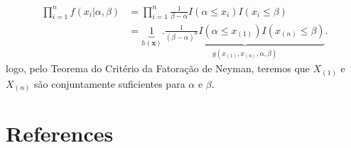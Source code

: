 \documentclass[
  letterpaper,
  DIV=11,
  numbers=noendperiod]{scrartcl}
\newlength{\cslhangindent}
\newenvironment{CSLReferences}[2] %
 {\begin{list}{}{%
  \setlength{\itemindent}{0pt}
  \setlength{\leftmargin}{0pt}
  \setlength{\parsep}{0pt}
  \ifodd #1
   \setlength{\leftmargin}{\cslhangindent}
   \setlength{\itemindent}{-1\cslhangindent}
  \fi
  \setlength{\itemsep}{#2\baselineskip}}}
 {\end{list}}
\begin{document}
\[\begin{align}\prod_{i=1}^n f(x_i|\alpha,\beta)&=\prod_{i=1}^n \frac{1}{\beta-\alpha}I(\alpha\leq x_i)I(x_i\leq\beta)\\&=\underbrace{1}_{h(\textbf{x})}.\underbrace{\frac{1}{(\beta-\alpha)^n}I(\alpha\leq x_{(1)})I(x_{(n)}\leq\beta)}_{g(x_{(1)},x_{(n)},\alpha,\beta
)}.\end{align}\] logo, pelo Teorema do Critério da Fatoração de Neyman,
teremos que \(X_{(1)}\) e \(X_{(n)}\) são conjuntamente suficientes para
\(\alpha\) e \(\beta\).


\chapter*{References}\label{references}


\label{refs}
\begin{CSLReferences}{0}{1}
\end{CSLReferences}
\end{document}
